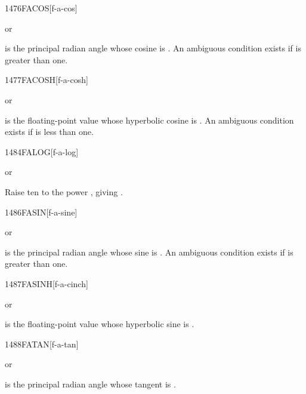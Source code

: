 \vspace*{-1.5ex}
\begin{worddef}{1476}{FACOS}[f-a-cos]
\item {} or

	 is the principal radian angle whose cosine is
	. An ambiguous condition exists if  is
	greater than one.
\end{worddef}

\vspace*{-1ex}
\begin{worddef}{1477}{FACOSH}[f-a-cosh]
\item {} or

	 is the floating-point value whose hyperbolic cosine is
	. An ambiguous condition exists if  is less
	than one.
\end{worddef}


\begin{worddef}{1484}{FALOG}[f-a-log]
\item {} or

	Raise ten to the power , giving .
\end{worddef}


\begin{worddef}{1486}{FASIN}[f-a-sine]
\item {} or

	 is the principal radian angle whose sine is .
	An ambiguous condition exists if  is greater than one.
\end{worddef}


\begin{worddef}{1487}{FASINH}[f-a-cinch]
\item {} or

	 is the floating-point value whose hyperbolic sine is
	.
\end{worddef}


\begin{worddef}{1488}{FATAN}[f-a-tan]
\item {} or

	 is the principal radian angle whose tangent is
	.
\end{worddef}


